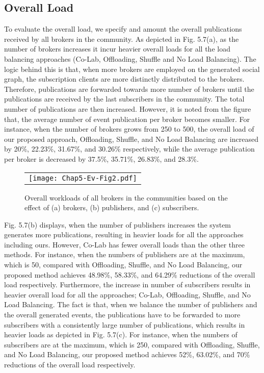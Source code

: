 \subsection{Overall Load}\label{Chap5_05_02}
To evaluate the overall load, we specify and amount the overall publications received by all brokers in the community. As depicted in Fig. 5.7(a), as the number of brokers increases it incur heavier overall loads for all the load balancing approaches (Co-Lab, Offloading, Shuffle and No Load Balancing). The logic behind this is that, when more brokers are employed on the generated social graph, the subscription clients are more distinctly distributed to the brokers. Therefore, publications are forwarded towards more number of brokers until the publications are received by the last subscribers in the community. The total number of publications are then increased. However, it is noted from the figure that, the average number of event publication per broker becomes smaller. For instance, when the number of brokers grows from 250 to 500, the overall load of our proposed approach, Offloading, Shuffle, and No Load Balancing are increased by 20\%, 22.23\%, 31.67\%, and 30.26\% respectively, while the average publication per broker is decreased by 37.5\%, 35.71\%, 26.83\%, and 28.3\%.
\begin{figure}[t]
\begin{center}
  \begin{tabular}{c}
  \texttt{[image: Chap5-Ev-Fig2.pdf]}
  \end{tabular}
  \caption{Overall workloads of all brokers in the communities based on the effect of (a) brokers, (b) publishers, and (c) subscribers.}
\end{center}
\end{figure}

Fig. 5.7(b) displays, when the number of publishers increases the system generates more publications, resulting in heavier loads for all the approaches including ours. However, Co-Lab has fewer overall loads than the other three methods. For instance, when the numbers of publishers are at the maximum, which is 50, compared with Offloading, Shuffle, and No Load Balancing, our proposed method achieves 48.98\%, 58.33\%, and 64.29\% reductions of the overall load respectively. Furthermore, the increase in number of subscribers results in heavier overall load for all the approaches; Co-Lab, Offloading, Shuffle, and No Load Balancing. The fact is that, when we balance the number of publishers and the overall generated events, the publications have to be forwarded to more subscribers with a consistently large number of publications, which results in heavier loads as depicted in Fig. 5.7(c). For instance, when the numbers of subscribers are at the maximum, which is 250, compared with Offloading, Shuffle, and No Load Balancing, our proposed method achieves 52\%, 63.02\%, and 70\% reductions of the overall load respectively.

